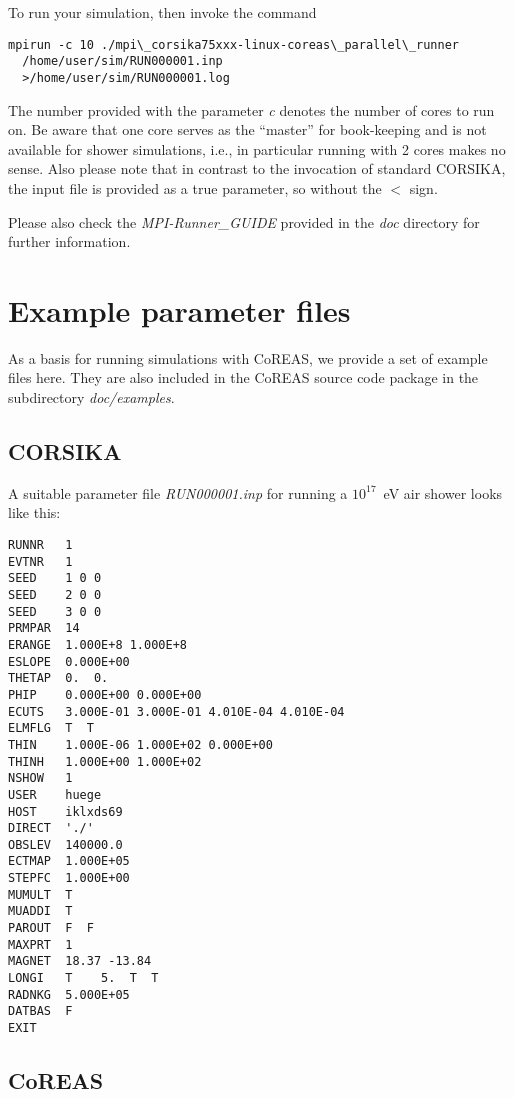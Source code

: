 \documentclass[a4paper,10pt]{article}
\begin{document}
To run your simulation, then invoke the command
%
\begin{verbatim}
mpirun -c 10 ./mpi\_corsika75xxx-linux-coreas\_parallel\_runner
  /home/user/sim/RUN000001.inp
  >/home/user/sim/RUN000001.log
\end{verbatim}
%
The number provided with the parameter {\em c} denotes the number of cores to run on. Be aware that one core serves as the ``master'' for book-keeping and is not available for shower simulations, i.e., in particular running with 2 cores makes no sense. Also please note that in contrast to the invocation of standard CORSIKA, the input file is provided as a true parameter, so without the $<$ sign.

Please also check the {\em MPI-Runner\_GUIDE} provided in the {\em doc} directory for further information.

\section{Example parameter files} \label{sec:examplefiles}

As a basis for running simulations with CoREAS, we provide a set of example files here. They are also included in the CoREAS source code package in the subdirectory {\it doc/examples}.

\subsection{CORSIKA}

A suitable parameter file {\it RUN000001.inp} for running a $10^{17}$~eV air shower looks like this:
%
\begin{verbatim}
RUNNR   1
EVTNR   1
SEED    1 0 0
SEED    2 0 0
SEED    3 0 0
PRMPAR  14
ERANGE  1.000E+8 1.000E+8
ESLOPE  0.000E+00
THETAP  0.  0.
PHIP    0.000E+00 0.000E+00
ECUTS   3.000E-01 3.000E-01 4.010E-04 4.010E-04
ELMFLG  T  T
THIN    1.000E-06 1.000E+02 0.000E+00
THINH   1.000E+00 1.000E+02
NSHOW   1
USER    huege
HOST    iklxds69
DIRECT  './'
OBSLEV  140000.0
ECTMAP  1.000E+05
STEPFC  1.000E+00
MUMULT  T
MUADDI  T
PAROUT  F  F
MAXPRT  1
MAGNET  18.37 -13.84
LONGI   T    5.  T  T
RADNKG  5.000E+05
DATBAS  F
EXIT
\end{verbatim}

\subsection{CoREAS}
\end{document}

